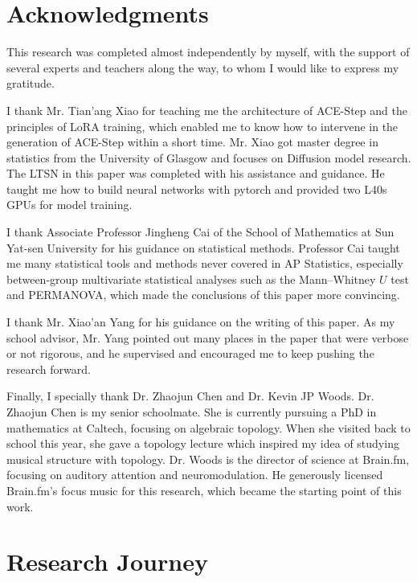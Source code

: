 \documentclass{article}
\begin{document}
\clearpage

\section{Acknowledgments}

This research was completed almost independently by myself, with the support of several experts and teachers along the way, to whom I would like to express my gratitude.

I thank Mr. Tian'ang Xiao for teaching me the architecture of ACE-Step and the principles of LoRA training, which enabled me to know how to intervene in the generation of ACE-Step within a short time. Mr. Xiao got master degree in statistics from the University of Glasgow and focuses on Diffusion model research. The LTSN in this paper was completed with his assistance and guidance. He taught me how to build neural networks with pytorch and provided two L40s GPUs for model training.

I thank Associate Professor Jingheng Cai of the School of Mathematics at Sun Yat-sen University for his guidance on statistical methods. Professor Cai taught me many statistical tools and methods never covered in AP Statistics, especially between-group multivariate statistical analyses such as the Mann--Whitney $U$ test and PERMANOVA, which made the conclusions of this paper more convincing.

I thank Mr. Xiao'an Yang for his guidance on the writing of this paper. As my school advisor, Mr. Yang pointed out many places in the paper that were verbose or not rigorous, and he supervised and encouraged me to keep pushing the research forward.

Finally, I specially thank Dr. Zhaojun Chen and Dr. Kevin JP Woods. Dr. Zhaojun Chen is my senior schoolmate. She is currently pursuing a PhD in mathematics at Caltech, focusing on algebraic topology. When she visited back to school this year, she gave a topology lecture which inspired my idea of studying musical structure with topology. Dr. Woods is the director of science at Brain.fm, focusing on auditory attention and neuromodulation. He generously licensed Brain.fm's focus music for this research, which became the starting point of this work.

\clearpage

\section{Research Journey}
\end{document}
